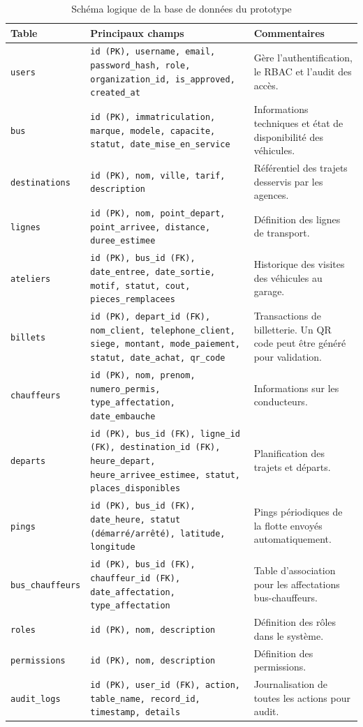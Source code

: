 \documentclass[a4paper, 12pt]{book}
\begin{document}
\begin{table}[H]
\centering
\renewcommand{\arraystretch}{1.3}
\begin{tabular}{|l|p{6.5cm}|p{6cm}|}
\hline
\textbf{Table} & \textbf{Principaux champs} & \textbf{Commentaires} \\
\hline
\texttt{users} &
\texttt{id (PK), username, email, password\_hash, role, organization\_id, is\_approved, created\_at} &
Gère l'authentification, le RBAC et l'audit des accès. \\
\hline
\texttt{bus} &
\texttt{id (PK), immatriculation, marque, modele, capacite, statut, date\_mise\_en\_service} &
Informations techniques et état de disponibilité des véhicules. \\
\hline
\texttt{destinations} &
\texttt{id (PK), nom, ville, tarif, description} &
Référentiel des trajets desservis par les agences. \\
\hline
\texttt{lignes} &
\texttt{id (PK), nom, point\_depart, point\_arrivee, distance, duree\_estimee} &
Définition des lignes de transport. \\
\hline
\texttt{ateliers} &
\texttt{id (PK), bus\_id (FK), date\_entree, date\_sortie, motif, statut, cout, pieces\_remplacees} &
Historique des visites des véhicules au garage. \\
\hline
\texttt{billets} &
\texttt{id (PK), depart\_id (FK), nom\_client, telephone\_client, siege, montant, mode\_paiement, statut, date\_achat, qr\_code} &
Transactions de billetterie. Un QR code peut être généré pour validation. \\
\hline
\texttt{chauffeurs} &
\texttt{id (PK), nom, prenom, numero\_permis, type\_affectation, date\_embauche} &
Informations sur les conducteurs. \\
\hline
\texttt{departs} &
\texttt{id (PK), bus\_id (FK), ligne\_id (FK), destination\_id (FK), heure\_depart, heure\_arrivee\_estimee, statut, places\_disponibles} &
Planification des trajets et départs. \\
\hline
\texttt{pings} &
\texttt{id (PK), bus\_id (FK), date\_heure, statut (démarré/arrêté), latitude, longitude} &
Pings périodiques de la flotte envoyés automatiquement. \\
\hline
\texttt{bus\_chauffeurs} &
\texttt{id (PK), bus\_id (FK), chauffeur\_id (FK), date\_affectation, type\_affectation} &
Table d'association pour les affectations bus-chauffeurs. \\
\hline
\texttt{roles} &
\texttt{id (PK), nom, description} &
Définition des rôles dans le système. \\
\hline
\texttt{permissions} &
\texttt{id (PK), nom, description} &
Définition des permissions. \\
\hline
\texttt{audit\_logs} &
\texttt{id (PK), user\_id (FK), action, table\_name, record\_id, timestamp, details} &
Journalisation de toutes les actions pour audit. \\
\hline
\end{tabular}
\caption{Schéma logique de la base de données du prototype}
\end{table}
\end{document}
